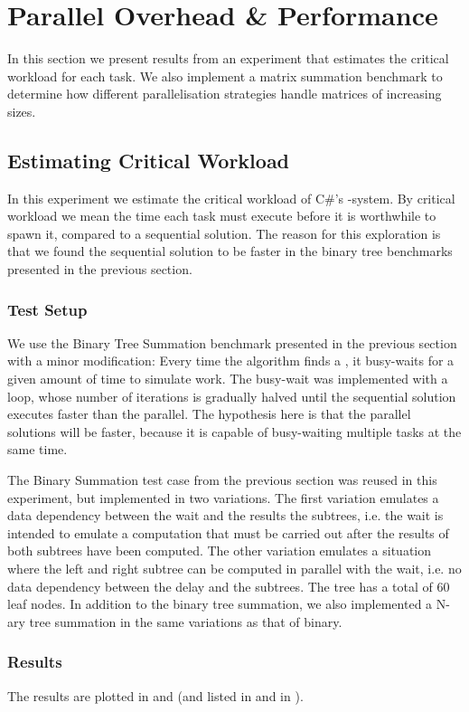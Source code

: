 \section{Parallel Overhead \& Performance}\label{sec:crit:work}
In this section we present results from an experiment that estimates the critical workload for each task. We also implement a matrix summation benchmark to determine how different parallelisation strategies handle matrices of increasing sizes.

\subsection{Estimating Critical Workload}
In this experiment we estimate the critical workload of C\#'s -system. By critical workload we mean the time each task must execute before it is worthwhile to spawn it, compared to a sequential solution. The reason for this exploration is that we found the sequential solution to be faster in the binary tree benchmarks presented in the previous section.

\subsubsection{Test Setup}
We use the Binary Tree Summation benchmark presented in the previous section with a minor modification: Every time the algorithm finds a , it busy-waits for a given amount of time to simulate work. The busy-wait was implemented with a loop, whose number of iterations is gradually halved until the sequential solution executes faster than the parallel. The hypothesis here is that the parallel solutions will be faster, because it is capable of busy-waiting multiple tasks at the same time.

The Binary Summation test case from the previous section was reused in this experiment, but implemented in two variations. The first variation emulates a data dependency between the wait and the results the subtrees, i.e. the wait is intended to emulate a computation that must be carried out after the results of both subtrees have been computed. The other variation emulates a situation where the left and right subtree can be computed in parallel with the wait, i.e. no data dependency between the delay and the subtrees. The tree has a total of 60 leaf nodes. In addition to the binary tree summation, we also implemented a N-ary tree summation in the same variations as that of binary.

\subsubsection{Results}
The results are plotted in  and  (and listed in  and  in ).

